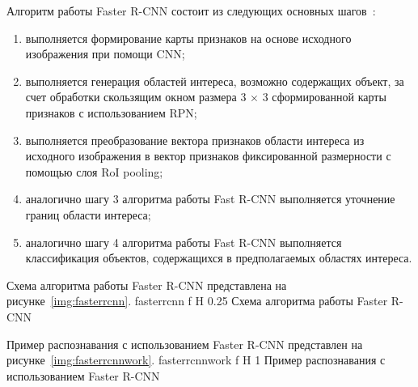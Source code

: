 Алгоритм работы Faster R-CNN состоит из следующих основных шагов~\cite{yolochina, rcnn, fasterrcnn}:
\begin{enumerate}[leftmargin=1.6\parindent]
	\item выполняется формирование карты признаков на основе исходного изображения при помощи CNN;
	\item выполняется генерация областей интереса, возможно содержащих объект, за счет обработки скользящим окном размера 3 $\times$ 3 сформированной карты признаков с использованием RPN;
	\item выполняется преобразование вектора признаков области интереса из исходного изображения в вектор признаков фиксированной размерности с помощью слоя RoI pooling;
	\item аналогично шагу 3 алгоритма работы Fast R-CNN выполняется уточнение границ области интереса;
	\item аналогично шагу 4 алгоритма работы Fast R-CNN выполняется классификация объектов, содержащихся в предполагаемых областях интереса.
\end{enumerate}

\clearpage
Схема алгоритма работы Faster R-CNN представлена на рисунке~\ref{img:fasterrcnn}.
	{fasterrcnn}
	{f}
	{H}
	{0.25\textwidth}
	{Схема алгоритма работы Faster R-CNN}

Пример распознавания с использованием Faster R-CNN представлен на рисунке~\ref{img:fasterrcnnwork}.
	{fasterrcnnwork}
	{f}
	{H}
	{1\textwidth}
	{Пример распознавания с использованием Faster R-CNN}
